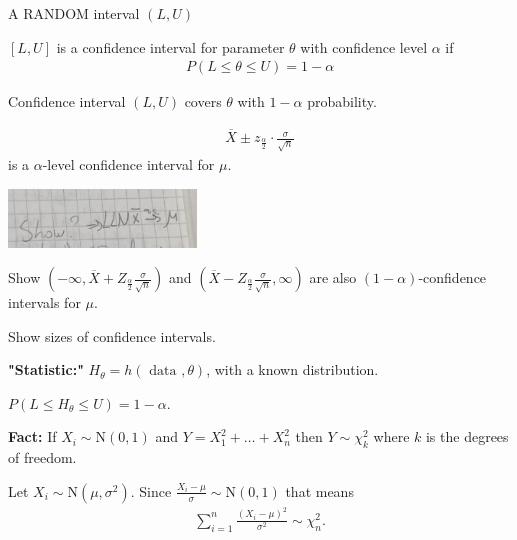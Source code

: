 \documentclass[10pt]{article}
\begin{document}
\begin{definition}  \label{def:Confidence_Interval}
A RANDOM interval \((L,U)\)

\([L,U]\) is a confidence interval for parameter \(\theta\) with confidence level \(\alpha\) if
\begin{align*}
P(L \leq \theta \leq U) =  1 - \alpha
\end{align*}

Confidence interval \((L,U)\) covers \(\theta\) with \(1 - \alpha\) probability.
\end{definition}



\begin{align*}
\overline{X} \pm z  _{\frac{\alpha}{2}} \cdot \frac{\sigma }{\sqrt{n}}
\end{align*}
is a \(\alpha\)-level confidence interval for \(\mu\).

\begin{exercise}[]  \label{exe:}
\begin{center}
\includegraphics[angle=0,width=5cm]{./img/exe1.png}
\end{center}
\end{exercise}


\begin{exercise}[]  \label{exe:}
Show
\(( - \infty , \overline{X} + Z  _{\frac{\alpha}{2}} \frac{\sigma}{\sqrt{n}})\) and
\((\overline{X} -  Z _{\frac{\alpha}{2}} \frac{\sigma}{\sqrt{n}}, \infty)\) are also \((1 - \alpha )\)-confidence intervals for \(\mu\).
\end{exercise}

\begin{exercise}[]  \label{exe:}
Show sizes of confidence intervals.
\end{exercise}



\textbf{"Statistic:"}
\(H _{\theta }  = h(\text{ data }, \theta )\), with a known distribution.

\(P( L \leq H _{\theta } \leq U) = 1 - \alpha\).

\textbf{Fact:}
If \(X_i \sim \text{N}(0 , 1)\) and \(Y =  X_1 ^2 + \dots + X_n^2\) then
\(Y \sim \chi  _{k} ^2\) where \(k\) is the degrees of freedom.

Let \(X_i \sim \text{N}(\mu , \sigma^2)\). Since \(\frac{X_i -  \mu }{\sigma } \sim \text{N}(0 , 1)\) that means
\begin{align*}
\sum_{ i = 1 }^{ n } \frac{\left( X_i - \mu  \right) ^2 }{\sigma ^2 } \sim \chi ^2  _{n} .
\end{align*}
\end{document}
